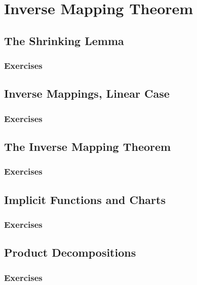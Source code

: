 \setcounter{chapter}{0}
\renewcommand{\thechapter}{18}
\chapter{Inverse Mapping Theorem}\label{ch:18}
\setcounter{equation}{0}	        %

\section{The Shrinking Lemma}\label{sec:18.1}
\subsection*{Exercises}\label{sec:18.1_Exercises}
\section{Inverse Mappings, Linear Case}\label{sec:18.2}	
\subsection*{Exercises}\label{sec:18.2_Exercises}
\section{The Inverse Mapping Theorem}\label{sec:18.3}	
\subsection*{Exercises}\label{sec:18.3_Exercises}
\section{Implicit Functions and Charts}\label{sec:18.4}	
\subsection*{Exercises}\label{sec:18.4_Exercises}
\section{Product Decompositions}\label{sec:18.5}	
\subsection*{Exercises}\label{sec:18.5_Exercises}
